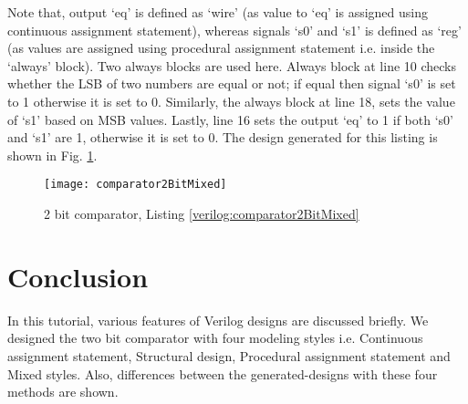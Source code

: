\begin{explanation}
	Note that, output `eq' is defined as `wire' (as value to `eq' is assigned using continuous assignment statement), whereas signals `s0' and `s1' is defined as `reg' (as values are assigned using procedural assignment statement i.e. inside the `always' block). Two always blocks are used here. Always block at line 10 checks whether the LSB of two numbers are equal or not; if equal then signal `s0' is set to 1 otherwise it is set to 0. Similarly, the always block at line 18, sets the value of `s1' based on MSB values. Lastly, line 16 sets the output `eq' to 1 if both `s0' and `s1' are 1, otherwise it is set to 0. The design generated for this listing is shown in Fig. \ref{fig:comparator2BitMixed}.
\end{explanation}

\begin{figure}
	\centering
	\texttt{[image: comparator2BitMixed]}
	\caption{2 bit comparator, Listing \ref{verilog:comparator2BitMixed}}
	\label{fig:comparator2BitMixed}
\end{figure}
%

\section{Conclusion}
In this tutorial, various features of Verilog designs are discussed briefly. We designed the two bit comparator with four modeling styles i.e. Continuous assignment statement, Structural design, Procedural assignment statement and Mixed styles. Also, differences between the generated-designs with these four methods are shown.